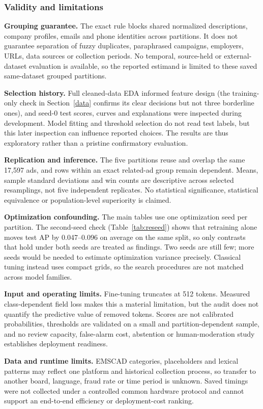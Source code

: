 \subsubsection{Validity and limitations}

\textbf{Grouping guarantee.} The exact rule blocks shared normalized descriptions, company profiles,
emails and phone identities across partitions. It does not guarantee separation of fuzzy duplicates,
paraphrased campaigns, employers, URLs, data sources or collection periods. No temporal, source-held
or external-dataset evaluation is available, so the reported estimand is limited to these saved
same-dataset grouped partitions.

\textbf{Selection history.} Full cleaned-data EDA informed feature design (the training-only
check in Section~\ref{data} confirms its clear decisions but not three borderline ones), and seed-0 test scores,
curves and explanations were inspected during development. Model fitting and threshold selection do
not read test labels, but this later inspection can influence reported choices. The results are thus
exploratory rather than a pristine confirmatory evaluation.

\textbf{Replication and inference.} The five partitions reuse and overlap the same 17,597 ads, and
rows within an exact related-ad group remain dependent. Means, sample standard deviations and win
counts are descriptive across selected resamplings, not five independent replicates. No statistical
significance, statistical equivalence or population-level superiority is claimed.

\textbf{Optimization confounding.} The main tables use one optimization seed per partition. The
second-seed check (Table~\ref{tab:reseed}) shows that retraining alone moves test AP by 0.047--0.096
on average on the same split, so only contrasts that hold under both seeds are treated as findings.
Two seeds are still few; more seeds would be needed to estimate optimization variance precisely.
Classical tuning instead uses compact grids, so the search procedures are not matched across model
families.

\textbf{Input and operating limits.} Fine-tuning truncates at 512 tokens. Measured class-dependent
field loss makes this a material limitation, but the audit does not quantify the predictive value of
removed tokens. Scores are not calibrated probabilities, thresholds are validated on a small and
partition-dependent sample, and no review capacity, false-alarm cost, abstention or human-moderation
study establishes deployment readiness.

\textbf{Data and runtime limits.} EMSCAD categories, placeholders and lexical patterns may reflect
one platform and historical collection process, so transfer to another board, language, fraud rate
or time period is unknown. Saved timings were not collected under a controlled common hardware
protocol and cannot support an end-to-end efficiency or deployment-cost ranking.
